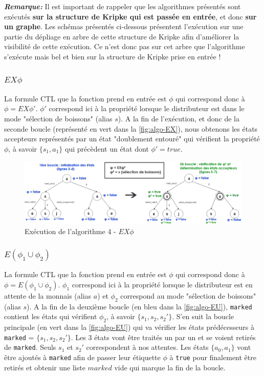 \documentclass[runningheads,a4paper,10pt]{llncs}
\begin{document}
\danger
\textbf{\textit{Remarque:}} Il est important de rappeler que les algorithmes présentés sont exécutés \textbf{sur la structure de Kripke qui est passée en entrée}, et donc \textbf{sur un graphe}. Les schémas présentés ci-dessous présentent l'exécution sur une partie du dépliage en arbre de cette structure de Kripke afin d'améliorer la visibilité de cette exécution. Ce n'est donc pas sur cet arbre que l'algorithme s'exécute mais bel et bien sur la structure de Kripke prise en entrée ! 

\subsubsection{$EX\phi$}

La formule CTL que la fonction prend en entrée est $\phi$ qui correspond donc à $\phi = EX\phi'$. $\phi '$ correspond ici à la propriété lorsque le distributeur est dans le mode "sélection de boissons" (alias $s$). A la fin de l'exécution, et donc de la seconde boucle (représenté en vert dans la \autoref{fig:algo-EX}), nous obtenons les états accepteurs représentés par un état "doublement entouré" qui vérifient la propriété $\phi$, à savoir $\{s_{1} ,a_{1}\}$ qui précèdent un état dont $\phi ' = true$.  


\begin{figure}
  \centering
   \includegraphics[scale=0.4]{figures/algo-EX.png}
   \caption[Caption for LOF]{Exécution de l'algorithme 4 - $EX\phi$}
   \label{fig:algo-EX}
\end{figure} 

\subsubsection{$E(\phi_{1} \cup \phi_{2})$}

La formule CTL que la fonction prend en entrée est $\phi$ qui correspond donc à $\phi = E(\phi_{1} \cup \phi_{2})$. $\phi_{1}$ correspond ici à la propriété lorsque le distributeur est en attente de la monnais (alias $a$) et $\phi_{2}$ correspond au mode "sélection de boissons" (alias $s$). A la fin de la deuxième boucle (en bleu dans la \autoref{fig:algo-EU}), \texttt{marked} contient les états qui vérifient $\phi_{2}$, à savoir $\{s_{1}, s_{2}, s_{2}'\}$. S'en suit la boucle principale (en vert dans la \autoref{fig:algo-EU}) qui va vérifier les états prédécesseurs à \texttt{marked} = $\{s_{1}, s_{2}, s_{2}'\}$. Les 3 états vont être traités un par un et se voient retirés de \texttt{marked}. Seuls $s_{1}$ et $s_{2}'$ correspondent à nos attentes. Les états $\{a_{0}, a_{1}\}$ vont être ajoutés à \texttt{marked} afin de passer leur étiquette $\phi$ à \texttt{true} pour finalement être retirés et obtenir une liste $marked$ vide qui marque la fin de la boucle. 
\end{document}
